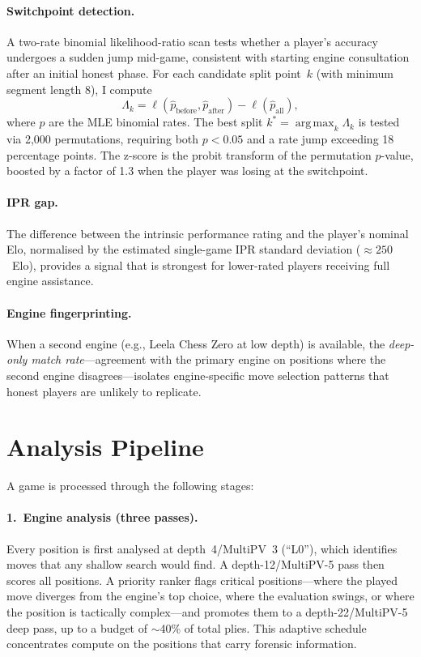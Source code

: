 \documentclass[11pt,a4paper]{article}
\DeclareMathOperator*{\argmax}{arg\,max}
\theoremstyle{definition}
\begin{document}
\paragraph{Switchpoint detection.}
A two-rate binomial likelihood-ratio scan tests whether a player's
accuracy undergoes a sudden jump mid-game, consistent with starting
engine consultation after an initial honest phase.  For each candidate
split point~$k$ (with minimum segment length 8), I compute
\begin{equation}
  \Lambda_k
  = \ell(\hat{p}_{\mathrm{before}}, \hat{p}_{\mathrm{after}})
  - \ell(\hat{p}_{\mathrm{all}}),
\end{equation}
where $\hat{p}$ are the MLE binomial rates.  The best split
$k^* = \argmax_k \Lambda_k$ is tested via 2{,}000 permutations,
requiring both $p < 0.05$ and a rate jump exceeding 18 percentage
points.  The z-score is the probit transform of the permutation
$p$-value, boosted by a factor of 1.3 when the player was losing at the
switchpoint.

\paragraph{IPR gap.}
The difference between the intrinsic performance rating and the player's
nominal Elo, normalised by the estimated single-game IPR standard
deviation ($\approx 250$~Elo), provides a signal that is strongest for
lower-rated players receiving full engine assistance.

\paragraph{Engine fingerprinting.}
When a second engine (e.g., Leela Chess Zero at low depth) is available,
the \emph{deep-only match rate}---agreement with the primary engine on
positions where the second engine disagrees---isolates engine-specific
move selection patterns that honest players are unlikely to replicate.

\section{Analysis Pipeline}
\label{sec:pipeline}

A game is processed through the following stages:

\paragraph{1.\ Engine analysis (three passes).}
Every position is first analysed at depth~4/MultiPV~3 (``L0''), which
identifies moves that any shallow search would find.  A depth-12/MultiPV-5
pass then scores all positions.  A priority ranker flags critical
positions---where the played move diverges from the engine's top choice,
where the evaluation swings, or where the position is tactically
complex---and promotes them to a depth-22/MultiPV-5 deep pass, up to a
budget of $\sim$40\% of total plies.  This adaptive schedule concentrates
compute on the positions that carry forensic information.
\end{document}
